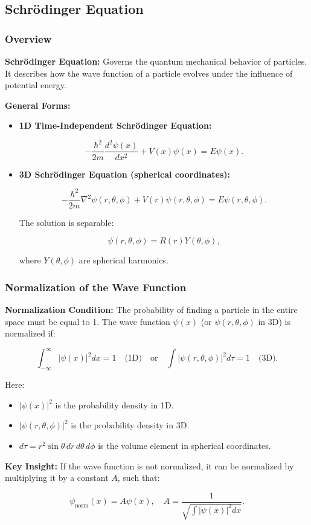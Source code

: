 \documentclass{article}
\newcommand{\eqbox}[1]{\begin{tcolorbox}[colback=gray!10] #1 \end{tcolorbox}}
\newcommand{\conceptbox}[1]{\begin{tcolorbox}[colback=blue!10] #1 \end{tcolorbox}}
\begin{document}
\subsection{Schrödinger Equation}

\subsubsection{Overview}
\conceptbox{
\textbf{Schrödinger Equation:} Governs the quantum mechanical behavior of particles. It describes how the wave function of a particle evolves under the influence of potential energy.

\textbf{General Forms:}
\begin{itemize}
    \item \textbf{1D Time-Independent Schrödinger Equation:}
    \eqbox{
    \[
    -\frac{\hbar^2}{2m} \frac{d^2\psi(x)}{dx^2} + V(x)\psi(x) = E\psi(x).
    \]}
    \item \textbf{3D Schrödinger Equation (spherical coordinates):}
    \eqbox{
    \[
    -\frac{\hbar^2}{2m} \nabla^2 \psi(r, \theta, \phi) + V(r)\psi(r, \theta, \phi) = E\psi(r, \theta, \phi).
    \]}
    The solution is separable:
    \eqbox{
    \[
    \psi(r, \theta, \phi) = R(r)Y(\theta, \phi),
    \]}
    where \( Y(\theta, \phi) \) are spherical harmonics.
\end{itemize}
}

\subsubsection{Normalization of the Wave Function}
\conceptbox{
\textbf{Normalization Condition:}
The probability of finding a particle in the entire space must be equal to 1. The wave function \( \psi(x) \) (or \( \psi(r, \theta, \phi) \) in 3D) is normalized if:
\eqbox{
\[
\int_{-\infty}^\infty |\psi(x)|^2 dx = 1 \quad \text{(1D)} \quad \text{or} \quad \int |\psi(r, \theta, \phi)|^2 d\tau = 1 \quad \text{(3D)}.
\]
}
Here:
\begin{itemize}
    \item \( |\psi(x)|^2 \) is the probability density in 1D.
    \item \( |\psi(r, \theta, \phi)|^2 \) is the probability density in 3D.
    \item \( d\tau = r^2 \sin\theta \, dr \, d\theta \, d\phi \) is the volume element in spherical coordinates.
\end{itemize}

\textbf{Key Insight:}
If the wave function is not normalized, it can be normalized by multiplying it by a constant \( A \), such that:
\eqbox{
\[
\psi_{\text{norm}}(x) = A\psi(x), \quad A = \frac{1}{\sqrt{\int |\psi(x)|^2 dx}}.
\]}
}
\end{document}
